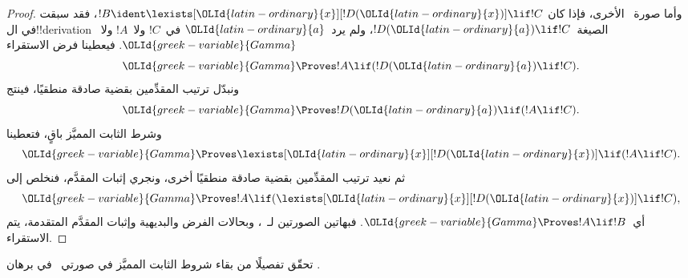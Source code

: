 \documentclass[../../../include/open-logic-section]{subfiles}
\begin{document}
\begin{proof}
وأما صورة~\QR{} الأخرى، فإذا كان
$!B \ident \lexists[\OLId{latin-ordinary}{x}][!D(\OLId{latin-ordinary}{x})] \lif !C$، فقد سبقت في ال!!{derivation}
الصيغة~$!D(\OLId{latin-ordinary}{a}) \lif !C$، ولم يرد~$\OLId{latin-ordinary}{a}$ في~$!C$ ولا~$!A$ ولا~$\OLId{greek-variable}{Gamma}$.
فيعطينا فرض الاستقراء
\[
  \OLId{greek-variable}{Gamma} \Proves !A \lif (!D(\OLId{latin-ordinary}{a}) \lif !C).
\]
ونبدّل ترتيب المقدِّمين بقضية صادقة منطقيًا، فينتج
\[
  \OLId{greek-variable}{Gamma} \Proves !D(\OLId{latin-ordinary}{a}) \lif (!A \lif !C).
\]
وشرط الثابت المميَّز باقٍ، فتعطينا~\QR{}
\[
  \OLId{greek-variable}{Gamma} \Proves \lexists[\OLId{latin-ordinary}{x}][!D(\OLId{latin-ordinary}{x})] \lif (!A \lif !C).
\]
ثم نعيد ترتيب المقدِّمين بقضية صادقة منطقيًا أخرى، ونجري إثبات المقدَّم،
فنخلص إلى
\[
  \OLId{greek-variable}{Gamma} \Proves !A \lif (\lexists[\OLId{latin-ordinary}{x}][!D(\OLId{latin-ordinary}{x})] \lif !C),
\]
أي~$\OLId{greek-variable}{Gamma} \Proves !A \lif !B$. فبهاتين الصورتين لـ~\QR{}، وبحالات
الفرض والبديهية وإثبات المقدَّم المتقدمة، يتم الاستقراء.
\end{proof}

\begin{prob}
  تحقّق تفصيلًا من بقاء شروط الثابت المميَّز في صورتي~\QR{} في برهان
  .
\end{prob}
\end{document}
